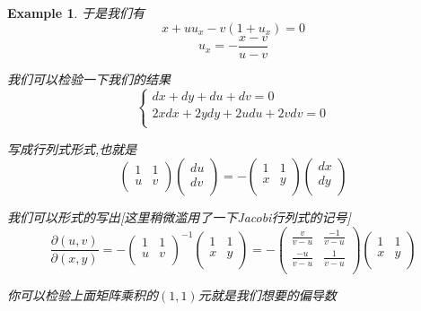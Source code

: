 \documentclass[11pt,hyperref,a4paper,UTF8]{ctexart}
\newtheorem{example}{Example}[subsection]
\begin{document}
\begin{CJK}{UTF8}{gkai}
\begin{example}
  于是我们有
  \[x + u u_x - v(1 + u_x) = 0\]
  \[u_x = - \frac{x - v}{u - v}\]


  我们可以检验一下我们的结果
  \[\begin{cases}
    dx + dy + du + dv = 0\\
    2x dx + 2y dy + 2u du + 2v dv = 0\\
  \end{cases}\]

  写成行列式形式,也就是
  \[\begin{pmatrix}
    1 & 1\\
    u & v\\
  \end{pmatrix}
  \begin{pmatrix}
    du\\
    dv\\
  \end{pmatrix}
  = -
  \begin{pmatrix}
    1 & 1\\
    x & y\\
  \end{pmatrix}
  \begin{pmatrix}
    dx\\
    dy\\
  \end{pmatrix}\]

  我们可以形式的写出[这里稍微滥用了一下Jacobi行列式的记号]
  \[\frac{\partial(u,v)}{\partial(x,y)} =  -\begin{pmatrix}
    1 & 1\\
    u & v\\
  \end{pmatrix}^{-1}
  \begin{pmatrix}
    1 & 1\\
    x & y\\
  \end{pmatrix}
  =
  -\begin{pmatrix}
    \frac{v}{v - u} & \frac{-1}{v - u}\\
    \frac{-u}{v - u} & \frac{1}{v - u}\\
  \end{pmatrix}
  \begin{pmatrix}
    1 & 1\\
    x & y\\
  \end{pmatrix}
  \]

  你可以检验上面矩阵乘积的$(1,1)$元就是我们想要的偏导数\\


\end{example}
\end{CJK}
\end{document}
